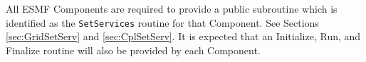 %


All ESMF Components are required to provide a public subroutine
which is identified as the {\tt SetServices} routine for that Component.
See Sections \ref{sec:GridSetServ} and \ref{sec:CplSetServ}.
It is expected that an Initialize, Run, and Finalize routine will
also be provided by each Component.
